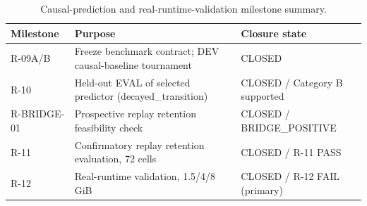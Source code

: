 \begin{table}[t]
\centering
\caption{Causal-prediction and real-runtime-validation milestone summary.}
\label{tab:c1-milestones}
\small
\begin{tabular}{@{}lp{6.3cm}l@{}}
\toprule
Milestone & Purpose & Closure state \\
\midrule
R-09A/B & Freeze benchmark contract; DEV causal-baseline tournament & CLOSED \\
R-10 & Held-out EVAL of selected predictor (decayed\_transition) & CLOSED / Category B supported \\
R-BRIDGE-01 & Prospective replay retention feasibility check & CLOSED / BRIDGE\_POSITIVE \\
R-11 & Confirmatory replay retention evaluation, 72 cells & CLOSED / R-11 PASS \\
R-12 & Real-runtime validation, 1.5/4/8 GiB & CLOSED / R-12 FAIL (primary) \\
\bottomrule
\end{tabular}
\end{table}
